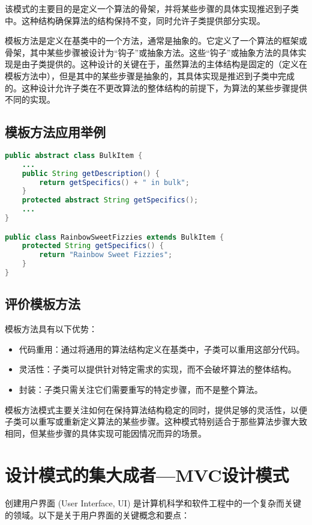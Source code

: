 该模式的主要目的是定义一个算法的骨架，并将某些步骤的具体实现推迟到子类中。这种结构确保算法的结构保持不变，同时允许子类提供部分实现。

模板方法是定义在基类中的一个方法，通常是抽象的。它定义了一个算法的框架或骨架，其中某些步骤被设计为“钩子”或抽象方法。这些“钩子”或抽象方法的具体实现是由子类提供的。这种设计的关键在于，虽然算法的主体结构是固定的（定义在模板方法中），但是其中的某些步骤是抽象的，其具体实现是推迟到子类中完成的。这种设计允许子类在不更改算法的整体结构的前提下，为算法的某些步骤提供不同的实现。

\subsection{模板方法应用举例}
\begin{lstlisting}[language=Java, caption=Template Method Design Pattern Example, label=lst:template_method_pattern]
public abstract class BulkItem {
	...
	public String getDescription() {
		return getSpecifics() + " in bulk";
	}
	protected abstract String getSpecifics();
	...
}

public class RainbowSweetFizzies extends BulkItem {
	protected String getSpecifics() {
		return "Rainbow Sweet Fizzies";
	}
}
\end{lstlisting}
\subsection{评价模板方法}
模板方法具有以下优势：
\begin{itemize}
	\item 代码重用：通过将通用的算法结构定义在基类中，子类可以重用这部分代码。
	\item 灵活性：子类可以提供针对特定需求的实现，而不会破坏算法的整体结构。
	\item 封装：子类只需关注它们需要重写的特定步骤，而不是整个算法。
\end{itemize}

模板方法模式主要关注如何在保持算法结构稳定的同时，提供足够的灵活性，以便子类可以重写或重新定义算法的某些步骤。这种模式特别适合于那些算法步骤大致相同，但某些步骤的具体实现可能因情况而异的场景。

\section{设计模式的集大成者---MVC设计模式}

创建用户界面 (User Interface, UI) 是计算机科学和软件工程中的一个复杂而关键的领域。以下是关于用户界面的关键概念和要点：

